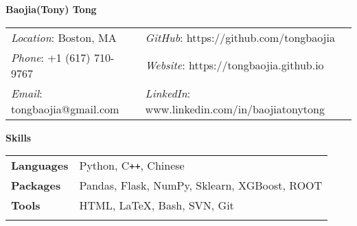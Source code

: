 \documentclass[letterpaper,11pt,oneside]{article}
\newcommand{\crimson}[1]{\textcolor[rgb]{0.67, 0.11, 0.188}{#1}}
\begin{document}
\noindent  \center \LARGE{\textbf{Baojia(Tony)   Tong}}  \\
\vspace{0.5cm}
\normalsize
\begin{center}
\begin{tabular}{l l}
 \textit{Location}: Boston, MA                             
 & \hspace{1.01in} \textit{GitHub}: https://github.com/tongbaojia \\
 \textit{Phone}: +1 (617) 710-9767	            
 & \hspace{1.01in} \textit{Website}: https://tongbaojia.github.io   \\
 \textit{Email}: tongbaojia@gmail.com            
 & \hspace{1.01in} \textit{LinkedIn}: www.linkedin.com/in/baojiatonytong  \\
\end{tabular}
\end{center}

 \vspace{0.1cm}
 \raggedright
 \textbf{\Large{\crimson{S}kills}} \sout{\hfill} \\
 \normalsize
 \begin{flushleft}
 \begin{tabular}{@{} l l }
     \textbf{Languages} & Python, C\texttt{++}, Chinese \\
     \textbf{Packages} & Pandas, Flask, NumPy, Sklearn, XGBoost, ROOT \\
     \textbf{Tools} & HTML, \LaTeX, Bash, SVN, Git \\
     \\
      \end{tabular}
\end{flushleft}
\end{document}
